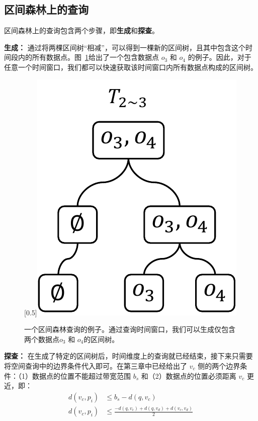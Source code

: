 \subsection{区间森林上的查询}

	区间森林上的查询包含两个步骤，即\textbf{生成}和\textbf{探查}。

	\textbf{生成：} 通过将两棵区间树“相减”，可以得到一棵新的区间树，且其中包含这个时间段内的所有数据点。图~\ref{fig:RFS2}给出了一个包含数据点 $o_3$ 和 $o_4$ 的例子。因此，对于任意一个时间窗口，我们都可以快速获取该时间窗口内所有数据点构成的区间树。
	
\begin{figure}[h!]\centering
	\scalebox{0.5}[0.5]{\includegraphics{./figures/RFS_2.pdf}}
	\caption{一个区间森林查询的例子。通过查询时间窗口，我们可以生成仅包含两个数据点$o_3$ 和 $o_4$的区间树。}
	\label{fig:RFS2}
\end{figure}

	\textbf{探查：} 在生成了特定的区间树后，时间维度上的查询就已经结束，接下来只需要将空间查询中的边界条件代入即可。在第三章中已经给出了 $v_c$ 侧的两个边界条件：（1）数据点的位置不能超过带宽范围 $b_s$ 和（2）数据点的位置必须距离 $v_c$ 更近，即：
	\begin{equation*}
	\begin{aligned}
		d(v_c, p_i) &\le b_s - d(q, v_c) \\
		d(v_c, p_i) &\le \frac{-d(q, v_c) + d(q, v_d) + d(v_c, v_d)}{2}
	\end{aligned}
	\end{equation*}
	
